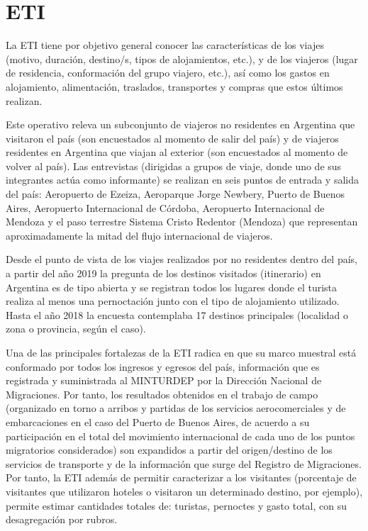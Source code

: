 \documentclass[
]{book}
\begin{document}
\hypertarget{eti}{%
\section{ETI}\label{eti}}

La ETI tiene por objetivo general conocer las características de los viajes (motivo, duración, destino/s, tipos de alojamientos, etc.), y de los viajeros (lugar de residencia, conformación del grupo viajero, etc.), así como los gastos en alojamiento, alimentación, traslados, transportes y compras que estos últimos realizan.

Este operativo releva un subconjunto de viajeros no residentes en Argentina que visitaron el país (son encuestados al momento de salir del país) y de viajeros residentes en Argentina que viajan al exterior (son encuestados al momento de volver al país). Las entrevistas (dirigidas a grupos de viaje, donde uno de sus integrantes actúa como informante) se realizan en seis puntos de entrada y salida del país: Aeropuerto de Ezeiza, Aeroparque Jorge Newbery, Puerto de Buenos Aires, Aeropuerto Internacional de Córdoba, Aeropuerto Internacional de Mendoza y el paso terrestre Sistema Cristo Redentor (Mendoza) que representan aproximadamente la mitad del flujo internacional de viajeros.

Desde el punto de vista de los viajes realizados por no residentes dentro del país, a partir del año 2019 la pregunta de los destinos visitados (itinerario) en Argentina es de tipo abierta y se registran todos los lugares donde el turista realiza al menos una pernoctación junto con el tipo de alojamiento utilizado. Hasta el año 2018 la encuesta contemplaba 17 destinos principales (localidad o zona o provincia, según el caso).

Una de las principales fortalezas de la ETI radica en que su marco muestral está conformado por todos los ingresos y egresos del país, información que es registrada y suministrada al MINTURDEP por la Dirección Nacional de Migraciones. Por tanto, los resultados obtenidos en el trabajo de campo (organizado en torno a arribos y partidas de los servicios aerocomerciales y de embarcaciones en el caso del Puerto de Buenos Aires, de acuerdo a su participación en el total del movimiento internacional de cada uno de los puntos migratorios considerados) son expandidos a partir del origen/destino de los servicios de transporte y de la información que surge del Registro de Migraciones. Por tanto, la ETI además de permitir caracterizar a los visitantes (porcentaje de visitantes que utilizaron hoteles o visitaron un determinado destino, por ejemplo), permite estimar cantidades totales de: turistas, pernoctes y gasto total, con su desagregación por rubros.
\end{document}
